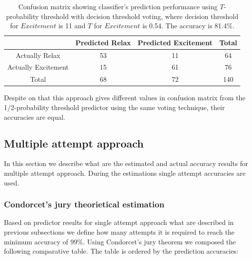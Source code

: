 \documentclass[12pt]{article}
\theoremstyle{definition}
\begin{document}
\begin{table}[H]
\begin{center}
  \begin{tabular}{ | c | c | c | c | }
    \hline
     & Predicted Relax & Predicted Excitement & Total \\ \hline
    Actually Relax & 53 & 11 & 64 \\ \hline
    Actually Excitement & 15 & 61 & 76 \\ \hline
    Total & 68 & 72 & 140 \\ 
    \hline
  \end{tabular}
\end{center}
\caption{Confusion matrix showing classifier's prediction performance using $T$-probability threshold with decision threshold voting, where decision threshold for $Excitement$ is 11 and $T$ for $Excitement$ is 0.54. The accuracy is 81.4\%.} 
\end{table}

Despite on that this approach gives different values in confusion matrix from the 1/2-probability threshold predictor using the same voting technique, their accuracies are equal.

\subsection{Multiple attempt approach}

In this section we describe what are the estimated and actual accuracy results for multiple attempt approach. During the estimations single attempt accuracies are used.
\subsubsection{Condorcet's jury theorietical estimation}\label{condorcet1}
Based on predictor results for single attempt approach what are described in previous subsections we define how many attempts it is required to reach the minimum accuracy of 99\%. Using Condorcet's jury theorem we composed the following comparative table. The table is ordered by the prediction accuracies:
\end{document}
